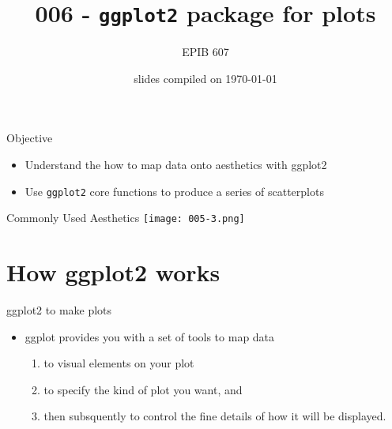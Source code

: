 \documentclass[10pt,handout]{beamer}\usepackage[]{graphicx}\usepackage[]{color}
\begin{document}
	

	
	
	\title{006 - \texttt{ggplot2} package for plots}
	\author{EPIB 607}
	
	\date{slides compiled on \today}
	
	\maketitle
	
	\begin{frame}{Objective}
	\begin{itemize}
		\item Understand the how to map data onto aesthetics with ggplot2
		\item Use \texttt{ggplot2} core functions to produce a series of scatterplots
	\end{itemize}
	\end{frame}

\begin{frame}{Commonly Used Aesthetics}
	\centering
	\texttt{[image: 005-3.png]}
\end{frame}

\section{How ggplot2 works}
	
		\begin{frame}{ggplot2 to make plots}
		\begin{itemize}
			\item ggplot provides you with a set of	tools to map data 
			\begin{enumerate}
				\item to visual elements on your plot
				\item to specify the kind of plot you want, and 
				\item then subsquently to control the fine details of how it will be displayed.
			\end{enumerate}
		\end{itemize}
	\end{frame}
\end{document}
